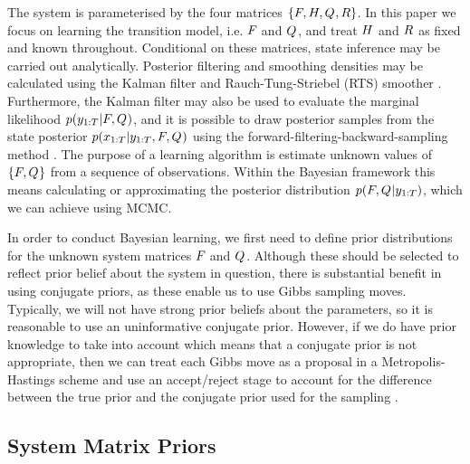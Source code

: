 \documentclass[journal,10pt]{IEEEtran}
\begin{document}
The system is parameterised by the four matrices $\left\{F_{}, H, Q_{}, R\right\}$. In this paper we focus on learning the transition model, i.e. $F_{}$ and $Q_{}$, and treat $H$ and $R$ as fixed and known throughout. Conditional on these matrices, state inference may be carried out analytically. Posterior filtering and smoothing densities may be calculated using the Kalman filter \cite{Kalman1960} and Rauch-Tung-Striebel (RTS) smoother \cite{Rauch1965}. Furthermore, the Kalman filter may also be used to evaluate the marginal likelihood $p(y_{1:T}|F_{}, Q_{})$, and it is possible to draw posterior samples from the state posterior $p(x_{1:T}|y_{1:T}, F_{}, Q_{})$ using the forward-filtering-backward-sampling method \cite{Chib1996}. The purpose of a learning algorithm is estimate unknown values of $\left\{F_{}, Q_{}\right\}$ from a sequence of observations. Within the Bayesian framework this means calculating or approximating the posterior distribution $p(F_{}, Q_{}|y_{1:T})$, which we can achieve using MCMC. 

In order to conduct Bayesian learning, we first need to define prior distributions for the unknown system matrices $F_{}$ and $Q_{}$. Although these should be selected to reflect prior belief about the system in question, there is substantial benefit in using conjugate priors, as these enable us to use Gibbs sampling moves. Typically, we will not have strong prior beliefs about the parameters, so it is reasonable to use an uninformative conjugate prior. However, if we do have prior knowledge to take into account which means that a conjugate prior is not appropriate, then we can treat each Gibbs move as a proposal in a Metropolis-Hastings scheme and use an accept/reject stage to account for the difference between the true prior and the conjugate prior used for the sampling \cite{Wills2012}.



\subsection{System Matrix Priors}
\end{document}
